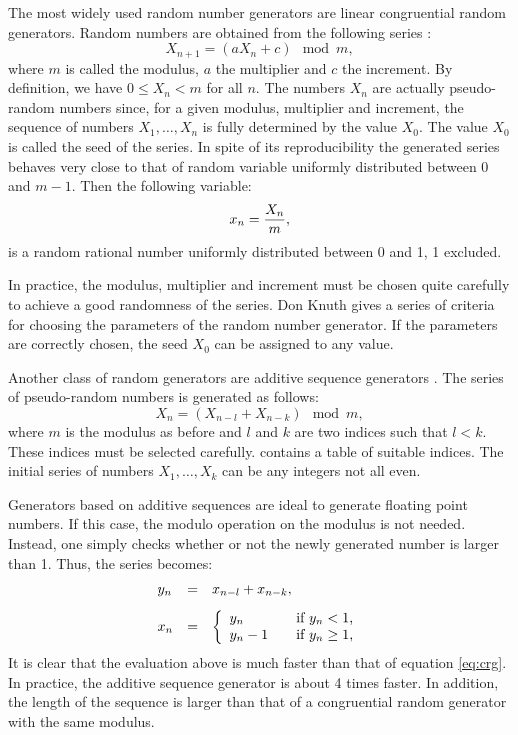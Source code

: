 \documentclass[twoside]{book}
\begin{document}
 The most widely
used random number generators are linear congruential random
generators. Random numbers are obtained from the following series
\cite{Knuth2}:
\begin{equation}
\label{eq:crg}
  X_{n+1} = \left(aX_n+c\right) \mod m,
\end{equation}
where $m$ is called the modulus, $a$ the multiplier and $c$ the
increment. By definition, we have $0\leq X_n<m$ for all $n$. The
numbers $X_n$ are actually pseudo-random numbers since, for a
given modulus, multiplier and increment, the sequence of numbers
$X_1,\ldots,X_n$ is fully determined by the value $X_0$. The value
$X_0$ is called the seed of the series. In spite of its
reproducibility the generated series behaves very close to that of
random variable uniformly distributed between 0 and $m-1$. Then
the following variable:
\begin{equation}
  x_n = {X_n \over m},
\end{equation}
is a random rational number uniformly distributed between 0 and 1,
1 excluded.

In practice, the modulus, multiplier and increment must be chosen
quite carefully to achieve a good randomness of the series. Don
Knuth \cite{Knuth2} gives a series of criteria for choosing the
parameters of the random number generator. If the parameters are
correctly chosen, the seed $X_0$ can be assigned to any value.

 Another class of random
generators are additive sequence generators \cite{Knuth2}. The
series of pseudo-random numbers is generated as follows:
\begin{equation}
  X_n = \left(X_{n-l}+X_{n-k}\right) \mod m,
\end{equation}
where $m$ is the modulus as before and $l$ and $k$ are two indices
such that $l<k$. These indices must be selected carefully.
\cite{Knuth2} contains a table of suitable indices. The initial
series of numbers $X_1,\ldots,X_k$ can be any integers not all
even.

Generators based on additive sequences are ideal to generate
floating point numbers. If this case, the modulo operation on the
modulus is not needed. Instead, one simply checks whether or not
the newly generated number is larger than 1. Thus, the series
becomes:
\begin{equation}
\label{eq:addseqrandom}
  \begin{array}{lcl}
  y_n&=&x_{n-l}+x_{n-k},\\*[2ex]
  x_n&=&\left\{
    \begin{array}{ll}
    y_n&\mbox{\quad if $y_n<1$,}\\
    y_n-1&\mbox{\quad if $y_n\geq 1$,}\\
    \end{array}
  \right.
  \end{array}
\end{equation}
It is clear that the evaluation above is much faster than that of
equation \ref{eq:crg}. In practice, the additive sequence
generator is about 4 times faster. In addition, the length of the
sequence is larger than that of a  congruential random generator
with the same modulus.
\end{document}
